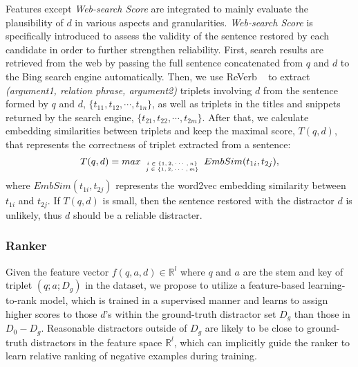 Features except \textit{Web-search Score} are integrated to mainly evaluate the plausibility of $d$ in various aspects and granularities. \textit{Web-search Score} is specifically introduced to assess
the validity of the sentence restored by each candidate in order to further strengthen reliability.  
First, search results are retrieved from the web by passing the full sentence 
concatenated from $q$ and $d$ to the Bing search engine automatically. 
Then, we use ReVerb ~\cite{fader2011identifying} to 
extract \textit{(argument1, relation phrase, argument2)} triplets 
involving $d$ from the sentence formed by $q$ and 
$d$, $\{t_{11}, t_{12}, \cdots, t_{1n}\}$, 
as well as triplets in the titles and snippets returned by the search engine, 
$\{t_{21}, t_{22}, \cdots, t_{2m}\}$. 
After that, we calculate embedding similarities 
between triplets and keep the maximal score, 
$T(q,d)$, that represents the correctness of triplet extracted from a sentence:
\begin{equation*}
	T(q,d) = max_{\tiny \begin{array}{c}
	i\in \{1,2,\cdots,n\} \\ j \in \{1,2,\cdots,m\}
	\end{array}
	} EmbSim(t_{1i}, t_{2j}),
\end{equation*}
where $EmbSim(t_{1i}, t_{2j})$ represents the word2vec embedding similarity between $t_{1i}$ and $t_{2j}$.
If $T(q,d)$ is small, then the sentence restored with the distractor $d$ is unlikely, thus $d$ should be a reliable distracter. 

\subsubsection{Ranker}
\label{sec:AMMR}
Given the feature vector $f(q, a, d)\in \mathbb{R}^l$ where $q$ and 
$a$ are the stem and key of triplet $(q; a; D_g)$ in the dataset, 
we propose to utilize a feature-based learning-to-rank model, 
which is trained in a supervised manner and learns to assign higher
scores to those $d$'s within the ground-truth distractor set $D_g$ 
than those in $D_0-D_g$. Reasonable distractors outside of $D_g$ are 
likely to be close to ground-truth distractors in the feature space 
$\mathbb{R}^l$, which can implicitly guide the ranker to learn relative 
ranking of negative examples during training.

